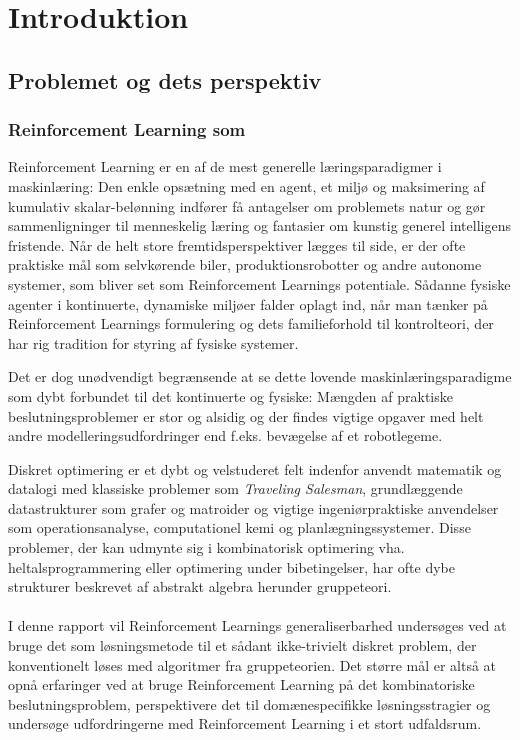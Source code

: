 \documentclass[../main.tex]{subfiles}
\begin{document}
\chapter{Introduktion}
\section{Problemet og dets perspektiv}
\subsection{Reinforcement Learning som }
Reinforcement Learning er en af de mest generelle læringsparadigmer i maskinlæring: 
Den enkle opsætning med en agent, et miljø og maksimering af kumulativ skalar-belønning indfører få antagelser om problemets natur og gør sammenligninger til menneskelig læring og fantasier om kunstig generel intelligens fristende.
Når de helt store fremtidsperspektiver lægges til side, er der ofte praktiske mål som selvkørende biler, produktionsrobotter og andre autonome systemer, som bliver set som Reinforcement Learnings potentiale.
Sådanne fysiske agenter i kontinuerte, dynamiske miljøer falder oplagt ind, når man tænker på Reinforcement Learnings formulering og dets familieforhold til kontrolteori, der har rig tradition for styring af fysiske systemer. 

Det er dog unødvendigt begrænsende at se dette lovende maskinlæringsparadigme som dybt forbundet til det kontinuerte og fysiske: Mængden af praktiske beslutningsproblemer er stor og alsidig og der findes vigtige opgaver med helt andre modelleringsudfordringer end f.eks. bevægelse af et robotlegeme.

Diskret optimering er et dybt og velstuderet felt indenfor anvendt matematik og datalogi med klassiske problemer som \textit{Traveling Salesman}, grundlæggende datastrukturer som grafer og matroider og vigtige ingeniørpraktiske anvendelser som operationsanalyse, computationel kemi og planlægningssystemer. 
Disse problemer, der kan udmynte sig i kombinatorisk optimering vha. heltalsprogrammering eller optimering under bibetingelser, har ofte dybe strukturer beskrevet af abstrakt algebra herunder gruppeteori.
\\
\\
I denne rapport vil Reinforcement Learnings generaliserbarhed undersøges ved at bruge det som løsningsmetode til et sådant ikke-trivielt diskret problem, der konventionelt løses med algoritmer fra gruppeteorien.
Det større mål er altså at opnå erfaringer ved at bruge Reinforcement Learning på det kombinatoriske beslutningsproblem, perspektivere det til domænespecifikke løsningsstragier og undersøge udfordringerne med Reinforcement Learning i et stort udfaldsrum. 
\end{document}
